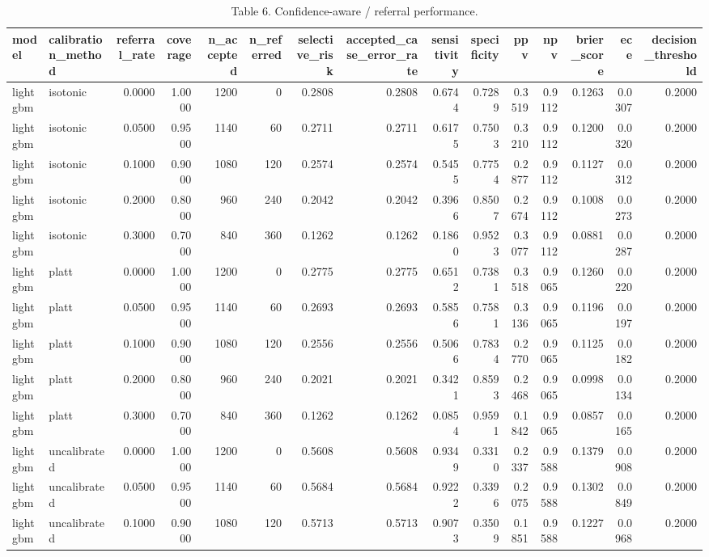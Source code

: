 \begin{table}[htbp]
\centering
\caption{Table 6. Confidence-aware / referral performance.}
\label{table6_referral_performance}
\begin{tabular}{llrrrrrrrrrrrrr}
\toprule
model & calibration\_method & referral\_rate & coverage & n\_accepted & n\_referred & selective\_risk & accepted\_case\_error\_rate & sensitivity & specificity & ppv & npv & brier\_score & ece & decision\_threshold \\
\midrule
lightgbm & isotonic & 0.0000 & 1.0000 & 1200 & 0 & 0.2808 & 0.2808 & 0.6744 & 0.7289 & 0.3519 & 0.9112 & 0.1263 & 0.0307 & 0.2000 \\
lightgbm & isotonic & 0.0500 & 0.9500 & 1140 & 60 & 0.2711 & 0.2711 & 0.6175 & 0.7503 & 0.3210 & 0.9112 & 0.1200 & 0.0320 & 0.2000 \\
lightgbm & isotonic & 0.1000 & 0.9000 & 1080 & 120 & 0.2574 & 0.2574 & 0.5455 & 0.7754 & 0.2877 & 0.9112 & 0.1127 & 0.0312 & 0.2000 \\
lightgbm & isotonic & 0.2000 & 0.8000 & 960 & 240 & 0.2042 & 0.2042 & 0.3966 & 0.8507 & 0.2674 & 0.9112 & 0.1008 & 0.0273 & 0.2000 \\
lightgbm & isotonic & 0.3000 & 0.7000 & 840 & 360 & 0.1262 & 0.1262 & 0.1860 & 0.9523 & 0.3077 & 0.9112 & 0.0881 & 0.0287 & 0.2000 \\
lightgbm & platt & 0.0000 & 1.0000 & 1200 & 0 & 0.2775 & 0.2775 & 0.6512 & 0.7381 & 0.3518 & 0.9065 & 0.1260 & 0.0220 & 0.2000 \\
lightgbm & platt & 0.0500 & 0.9500 & 1140 & 60 & 0.2693 & 0.2693 & 0.5856 & 0.7581 & 0.3136 & 0.9065 & 0.1196 & 0.0197 & 0.2000 \\
lightgbm & platt & 0.1000 & 0.9000 & 1080 & 120 & 0.2556 & 0.2556 & 0.5066 & 0.7834 & 0.2770 & 0.9065 & 0.1125 & 0.0182 & 0.2000 \\
lightgbm & platt & 0.2000 & 0.8000 & 960 & 240 & 0.2021 & 0.2021 & 0.3421 & 0.8593 & 0.2468 & 0.9065 & 0.0998 & 0.0134 & 0.2000 \\
lightgbm & platt & 0.3000 & 0.7000 & 840 & 360 & 0.1262 & 0.1262 & 0.0854 & 0.9591 & 0.1842 & 0.9065 & 0.0857 & 0.0165 & 0.2000 \\
lightgbm & uncalibrated & 0.0000 & 1.0000 & 1200 & 0 & 0.5608 & 0.5608 & 0.9349 & 0.3310 & 0.2337 & 0.9588 & 0.1379 & 0.0908 & 0.2000 \\
lightgbm & uncalibrated & 0.0500 & 0.9500 & 1140 & 60 & 0.5684 & 0.5684 & 0.9222 & 0.3396 & 0.2075 & 0.9588 & 0.1302 & 0.0849 & 0.2000 \\
lightgbm & uncalibrated & 0.1000 & 0.9000 & 1080 & 120 & 0.5713 & 0.5713 & 0.9073 & 0.3509 & 0.1851 & 0.9588 & 0.1227 & 0.0968 & 0.2000 \\

\end{tabular}
\end{table}
